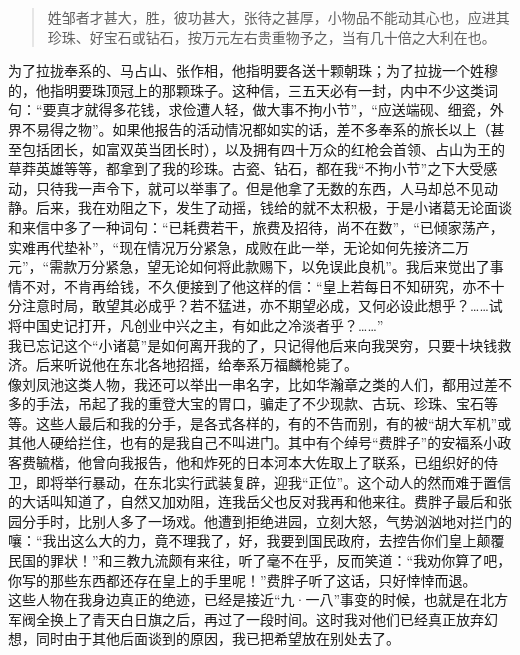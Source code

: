 \begin{quote}
	姓邹者才甚大，胜，彼功甚大，张待之甚厚，小物品不能动其心也，应进其珍珠、好宝石或钻石，按万元左右贵重物予之，当有几十倍之大利在也。\\
\end{quote}

为了拉拢奉系的、马占山、张作相，他指明要各送十颗朝珠；为了拉拢一个姓穆的，他指明要珠顶冠上的那颗珠子。这种信，三五天必有一封，内中不少这类词句：“要真才就得多花钱，求俭遭人轻，做大事不拘小节”，“应送端砚、细瓷，外界不易得之物”。如果他报告的活动情况都如实的话，差不多奉系的旅长以上（甚至包括团长，如富双英当团长时），以及拥有四十万众的红枪会首领、占山为王的草莽英雄等等，都拿到了我的珍珠。古瓷、钻石，都在我“不拘小节”之下大受感动，只待我一声令下，就可以举事了。但是他拿了无数的东西，人马却总不见动静。后来，我在劝阻之下，发生了动摇，钱给的就不太积极，于是小诸葛无论面谈和来信中多了一种词句：“已耗费若干，旅费及招待，尚不在数”，“已倾家荡产，实难再代垫补”，“现在情况万分紧急，成败在此一举，无论如何先接济二万元”，“需款万分紧急，望无论如何将此款赐下，以免误此良机”。我后来觉出了事情不对，不肯再给钱，不久便接到了他这样的信：“皇上若每日不知研究，亦不十分注意时局，敢望其必成乎？若不猛进，亦不期望必成，又何必设此想乎？……试将中国史记打开，凡创业中兴之主，有如此之冷淡者乎？……”\\

我已忘记这个“小诸葛”是如何离开我的了，只记得他后来向我哭穷，只要十块钱救济。后来听说他在东北各地招摇，给奉系万福麟枪毙了。\\

像刘凤池这类人物，我还可以举出一串名字，比如华瀚章之类的人们，都用过差不多的手法，吊起了我的重登大宝的胃口，骗走了不少现款、古玩、珍珠、宝石等等。这些人最后和我的分手，是各式各样的，有的不告而别，有的被“胡大军机”或其他人硬给拦住，也有的是我自己不叫进门。其中有个绰号“费胖子”的安福系小政客费毓楷，他曾向我报告，他和炸死的日本河本大佐取上了联系，已组织好的侍卫，即将举行暴动，在东北实行武装复辟，迎我“正位”。这个动人的然而难于置信的大话叫知道了，自然又加劝阻，连我岳父也反对我再和他来往。费胖子最后和张园分手时，比别人多了一场戏。他遭到拒绝进园，立刻大怒，气势汹汹地对拦门的嚷：“我出这么大的力，竟不理我了，好，我要到国民政府，去控告你们皇上颠覆民国的罪状！”和三教九流颇有来往，听了毫不在乎，反而笑道：“我劝你算了吧，你写的那些东西都还存在皇上的手里呢！”费胖子听了这话，只好悻悻而退。\\

这些人物在我身边真正的绝迹，已经是接近“九·一八”事变的时候，也就是在北方军阀全换上了青天白日旗之后，再过了一段时间。这时我对他们已经真正放弃幻想，同时由于其他后面谈到的原因，我已把希望放在别处去了。
